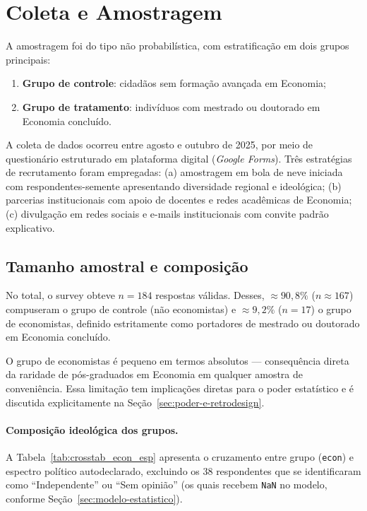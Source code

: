 \section{Coleta e Amostragem}\label{sec:coleta-amostragem}

A amostragem foi do tipo não probabilística, com estratificação em dois grupos principais:
\begin{enumerate}[label=\alph*)]
    \item \textbf{Grupo de controle}: cidadãos sem formação avançada em Economia;
    \item \textbf{Grupo de tratamento}: indivíduos com mestrado ou doutorado em Economia concluído.
\end{enumerate}

A coleta de dados ocorreu entre agosto e outubro de 2025, por meio de questionário estruturado em plataforma digital (\textit{Google Forms}). Três estratégias de recrutamento foram empregadas: (a) amostragem em bola de neve iniciada com respondentes-semente apresentando diversidade regional e ideológica; (b) parcerias institucionais com apoio de docentes e redes acadêmicas de Economia; (c) divulgação em redes sociais e e-mails institucionais com convite padrão explicativo.

\subsection{Tamanho amostral e composição}
\label{sec:tamanho_amostral}

No total, o survey obteve $n = 184$ respostas válidas. Desses, $\approx 90{,}8\%$ ($n \approx 167$) compuseram o grupo de controle (não economistas) e $\approx 9{,}2\%$ ($n = 17$) o grupo de economistas, definido estritamente como portadores de mestrado ou doutorado em Economia concluído.

O grupo de economistas é pequeno em termos absolutos — consequência direta da raridade de pós-graduados em Economia em qualquer amostra de conveniência. Essa limitação tem implicações diretas para o poder estatístico e é discutida explicitamente na Seção~\ref{sec:poder-e-retrodesign}.

\paragraph{Composição ideológica dos grupos.}

A Tabela~\ref{tab:crosstab_econ_esp} apresenta o cruzamento entre grupo (\texttt{econ}) e espectro político autodeclarado, excluindo os 38 respondentes que se identificaram como ``Independente'' ou ``Sem opinião'' (os quais recebem \texttt{NaN} no modelo, conforme Seção~\ref{sec:modelo-estatistico}).

